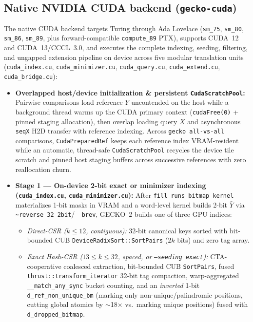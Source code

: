 \documentclass[pdflatex,sn-vancouver,Numbered]{sn-jnl}
\begin{document}
\subsection{Native NVIDIA CUDA backend (\texttt{gecko-cuda})}\label{subsec:cuda}

The native CUDA backend targets Turing through Ada Lovelace (\texttt{sm\_75}, \texttt{sm\_80}, \texttt{sm\_86}, \texttt{sm\_89}, plus forward-compatible \texttt{compute\_89} PTX), supports CUDA~12 and CUDA~13/CCCL~3.0, and executes the complete indexing, seeding, filtering, and ungapped extension pipeline on device across five modular translation units (\texttt{cuda\_index.cu}, \texttt{cuda\_minimizer.cu}, \texttt{cuda\_query.cu}, \texttt{cuda\_extend.cu}, \texttt{cuda\_bridge.cu}):
\begin{itemize}
    \item \textbf{Overlapped host/device initialization \& persistent \texttt{CudaScratchPool}:} Pairwise comparisons load reference $Y$ uncontended on the host while a background thread warms up the CUDA primary context (\texttt{cudaFree(0)} + pinned staging allocation), then overlap loading query $X$ and asynchronous \texttt{seqX} H2D transfer with reference indexing. Across \texttt{gecko all-vs-all} comparisons, \texttt{CudaPreparedRef} keeps each reference index VRAM-resident while an automatic, thread-safe \texttt{CudaScratchPool} recycles the device tile scratch and pinned host staging buffers across successive references with zero reallocation churn.
    \item \textbf{Stage 1 --- On-device 2-bit exact or minimizer indexing (\texttt{cuda\_index.cu}, \texttt{cuda\_minimizer.cu}):} After \texttt{fill\_runs\_bitmap\_kernel} materializes 1-bit masks in VRAM and a word-level kernel builds 2-bit $\bar{Y}$ via \texttt{\~{}reverse\_32\_2bit}/\texttt{\_\_brev}, GECKO~2 builds one of three GPU indices:
    \begin{itemize}
        \item \emph{Direct-CSR ($k \le 12$, contiguous):} 32-bit canonical keys sorted with bit-bounded CUB \texttt{DeviceRadixSort::SortPairs} \cite{merrill2015cub} ($2k$ bits) and zero tag array.
        \item \emph{Exact Hash-CSR ($13 \le k \le 32$, spaced, or \texttt{--seeding exact}):} CTA-cooperative coalesced extraction, bit-bounded CUB \texttt{SortPairs}, fused \texttt{thrust::transform\_iterator} 32-bit tag compaction, warp-aggregated \texttt{\_\_match\_any\_sync} bucket counting, and an \emph{inverted} 1-bit \texttt{d\_ref\_non\_unique\_bm} (marking only non-unique/palindromic positions, cutting global atomics by $\sim$18$\times$ vs.\ marking unique positions) fused with \texttt{d\_dropped\_bitmap}.

\end{itemize}
\end{itemize}
\end{document}
